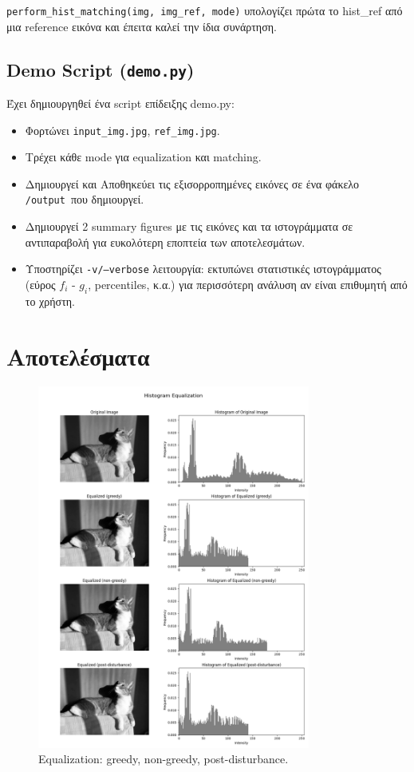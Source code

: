 \documentclass{article}
\begin{document}
\texttt{perform\_hist\_matching(img, img\_ref, mode)} υπολογίζει πρώτα
το hist\_ref από μια reference εικόνα και έπειτα καλεί την ίδια συνάρτηση.

\subsection{Demo Script (\texttt{demo.py})}
Έχει δημιουργηθεί ένα script επίδειξης demo.py:
\begin{itemize}
  \item Φορτώνει \texttt{input\_img.jpg}, \texttt{ref\_img.jpg}.
  \item Τρέχει κάθε mode για equalization και matching.
  \item Δημιουργεί και Αποθηκεύει τις εξισορροπημένες εικόνες σε ένα φάκελο \texttt{/output}\ που δημιουργεί.
  \item Δημιουργεί 2 summary figures με τις εικόνες και τα ιστογράμματα σε αντιπαραβολή για ευκολότερη εποπτεία των αποτελεσμάτων.
  \item Υποστηρίζει \texttt{-v/--verbose} λειτουργία: εκτυπώνει στατιστικές
  ιστογράμματος (εύρος \(f_i\) - \(g_i\), percentiles, κ.α.) για περισσότερη ανάλυση αν είναι επιθυμητή από το χρήστη.
\end{itemize}

\section{Αποτελέσματα}
\begin{figure}[H]
  \centering
  \includegraphics[width=0.8\textwidth]{histogram_equalization_results.png}
  \caption{Equalization: greedy, non-greedy, post-disturbance.}
  \label{fig:eq}
\end{figure}
\end{document}
